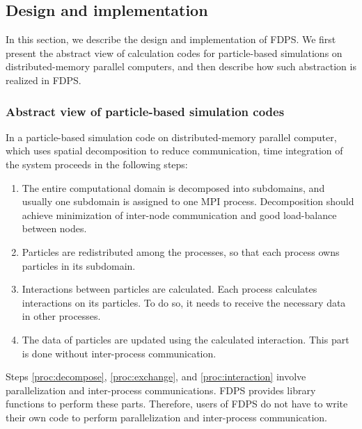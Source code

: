 


\subsection{Design and implementation}
\label{sec:design}

In this section, we describe the design and implementation of FDPS. We
first present the abstract view of calculation codes for particle-based
simulations on distributed-memory parallel computers, and then
describe how such abstraction is realized in FDPS.

\subsubsection{Abstract view of particle-based simulation codes}
\label{sec:view}

In a particle-based simulation code on distributed-memory parallel
computer, which uses spatial decomposition to reduce communication,
time integration of the system proceeds in the following steps:

\begin{enumerate}
\item The entire computational domain is decomposed into subdomains,
  and usually one subdomain is assigned to one MPI
  process. Decomposition should achieve minimization of inter-node
  communication and good load-balance between nodes.
 \label{proc:decompose}

\item Particles are redistributed among the processes, so that each
  process owns particles in its subdomain.\label{proc:exchange}

\item Interactions between  particles are calculated.
   Each process  calculates interactions on its particles. To do so,
   it needs to receive the necessary data in other processes.
  \label{proc:interaction}

\item The data of particles are updated using the calculated
  interaction. This part is done without inter-process communication.
   \label{proc:local}
\end{enumerate}

Steps \ref{proc:decompose}, \ref{proc:exchange}, and
\ref{proc:interaction} involve parallelization and inter-process
communications. FDPS provides library functions to perform these parts. Therefore, 
users of FDPS do not have to write their own code to perform 
parallelization and inter-process communication.

